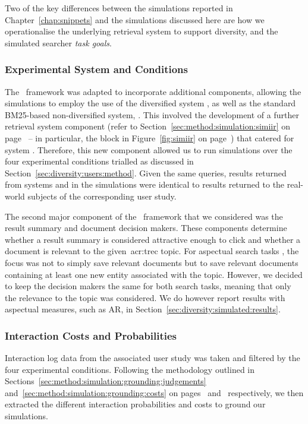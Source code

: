 Two of the key differences between the simulations reported in Chapter~\ref{chap:snippets} and the simulations discussed here are how we operationalise the underlying retrieval system to support diversity, and the simulated searcher \emph{task goals}.

\subsubsection{Experimental System and Conditions}\label{sec:diversity:simulated:method:system}
The \simiir~framework was adapted to incorporate additional components, allowing the simulations to employ the use of the diversified system , as well as the standard BM25-based non-diversified system, . This involved the development of a further retrieval system component (refer to Section~\ref{sec:method:simulation:simiir} on page~\pageref{sec:method:simulation:simiir} -- in particular, the  block in Figure~\ref{fig:simiir} on page~\pageref{fig:simiir}) that catered for system . Therefore, this new component allowed us to run simulations over the four experimental conditions trialled as discussed in Section~\ref{sec:diversity:users:method}. Given the same queries, results returned from systems  and  in the simulations were identical to results returned to the real-world subjects of the corresponding user study.

The second major component of the \simiir~framework that we considered was the result summary and document decision makers. These components determine whether a result summary is considered attractive enough to click and whether a document is relevant to the given~\gls{acr:trec} topic. For aspectual search tasks , the focus was not to simply save relevant documents but to save relevant documents containing at least one new entity associated with the topic. However, we decided to keep the decision makers the same for both search tasks, meaning that only the relevance to the topic was considered. We do however report results with aspectual measures, such as AR, in Section~\ref{sec:diversity:simulated:results}.

\subsubsection{Interaction Costs and Probabilities}\label{sec:diversity:simulated:method:probscosts}
Interaction log data from the associated user study was taken and filtered by the four experimental conditions. Following the methodology outlined in Sections~\ref{sec:method:simulation:grounding:judgements} and~\ref{sec:method:simulation:grounding:costs} on pages~\pageref{sec:method:simulation:grounding:judgements} and~\pageref{sec:method:simulation:grounding:costs} respectively, we then extracted the different interaction probabilities and costs to ground our simulations.

